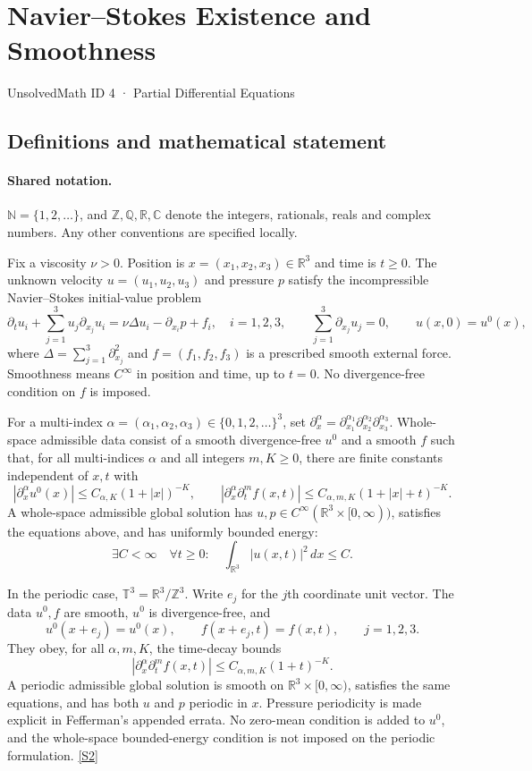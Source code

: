 \documentclass[11pt]{article}
\newcommand{\sref}[2]{\hyperlink{source:#1:#2}{[S#2]}}
\begin{document}
\setcounter{section}{3}
\section{Navier–Stokes Existence and Smoothness}\label{4}
{\small\sffamily UnsolvedMath ID 4 · Partial Differential Equations}
\subsection{Definitions and mathematical statement}

\paragraph{Shared notation.}$\mathbb N=\{1,2,\ldots\}$, and $\mathbb Z,\mathbb Q,\mathbb R,\mathbb C$ denote the integers, rationals, reals and complex numbers. Any other conventions are specified locally.


Fix a viscosity $\nu>0$. Position is $x=(x_1,x_2,x_3)\in\mathbb R^3$ and time is $t\ge0$. The unknown velocity $u=(u_1,u_2,u_3)$ and pressure $p$ satisfy the incompressible Navier--Stokes initial-value problem
\[
 \partial_t u_i+\sum_{j=1}^3u_j\partial_{x_j}u_i
 =\nu\Delta u_i-\partial_{x_i}p+f_i,
 \quad i=1,2,3,\qquad
 \sum_{j=1}^3\partial_{x_j}u_j=0,\qquad u(x,0)=u^0(x),
\]
where $\Delta=\sum_{j=1}^3\partial_{x_j}^2$ and $f=(f_1,f_2,f_3)$ is a prescribed smooth external force. Smoothness means $C^\infty$ in position and time, up to $t=0$. No divergence-free condition on $f$ is imposed.

For a multi-index $\alpha=(\alpha_1,\alpha_2,\alpha_3)\in\{0,1,2,\ldots\}^3$, set $\partial_x^\alpha=\partial_{x_1}^{\alpha_1}\partial_{x_2}^{\alpha_2}\partial_{x_3}^{\alpha_3}$. Whole-space admissible data consist of a smooth divergence-free $u^0$ and a smooth $f$ such that, for all multi-indices $\alpha$ and all integers $m,K\ge0$, there are finite constants independent of $x,t$ with
\[
 |\partial_x^\alpha u^0(x)|\le C_{\alpha,K}(1+|x|)^{-K},\qquad
 |\partial_x^\alpha\partial_t^m f(x,t)|\le C_{\alpha,m,K}(1+|x|+t)^{-K}.
\]
A whole-space admissible global solution has $u,p\in C^\infty(\mathbb R^3\times[0,\infty))$, satisfies the equations above, and has uniformly bounded energy:
\[
 \exists C<\infty\quad\forall t\ge0:\quad
 \int_{\mathbb R^3}|u(x,t)|^2\,dx\le C.
\]

In the periodic case, $\mathbb T^3=\mathbb R^3/\mathbb Z^3$. Write $e_j$ for the $j$th coordinate unit vector. The data $u^0,f$ are smooth, $u^0$ is divergence-free, and
\[
 u^0(x+e_j)=u^0(x),\qquad f(x+e_j,t)=f(x,t),\qquad j=1,2,3.
\]
They obey, for all $\alpha,m,K$, the time-decay bounds
\[
 |\partial_x^\alpha\partial_t^m f(x,t)|
 \le C_{\alpha,m,K}(1+t)^{-K}.
\]
A periodic admissible global solution is smooth on $\mathbb R^3\times[0,\infty)$, satisfies the same equations, and has both $u$ and $p$ periodic in $x$. Pressure periodicity is made explicit in Fefferman's appended errata. No zero-mean condition is added to $u^0$, and the whole-space bounded-energy condition is not imposed on the periodic formulation. \sref{4}{2}
\end{document}
